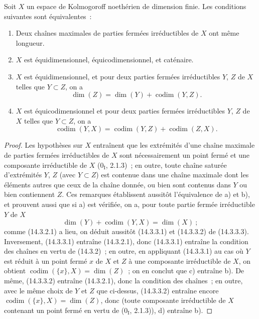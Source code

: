 \begin{proposition}[14.3.3]
\label{0.14.3.3-fr}
Soit $X$ un espace de Kolmogoroff noethérien de dimension finie. Les
conditions suivantes sont équivalentes~:
\begin{enumerate}
  \item[\rm(a)] Deux chaînes maximales de parties fermées irréductibles de $X$
  ont même longueur.
  \item[\rm(b)] $X$ est équidimensionnel, équicodimensionnel, et caténaire.
  \item[\rm(c)] $X$ est équidimensionnel, et pour deux parties fermées
  irréductibles $Y$, $Z$ de $X$ telles que $Y\subset Z$, on a
  \[
    \dim(Z)=\dim(Y)+\operatorname{codim}(Y,Z).
    \tag{14.3.3.1}\label{0.14.3.3.1-fr}
  \]
  \item[\rm(d)] $X$ est équicodimensionnel et pour deux parties fermées
  irréductibles $Y$, $Z$ de $X$ telles que $Y\subset Z$, on a
  \[
    \operatorname{codim}(Y,X)=
    \operatorname{codim}(Y,Z)+\operatorname{codim}(Z,X).
    \tag{14.3.3.2}\label{0.14.3.3.2-fr}
  \]
\end{enumerate}
\end{proposition}

\begin{proof}
Les hypothèses sur $X$ entraînent que les extrémités d'une chaîne maximale de
parties fermées irréductibles de $X$ sont nécessairement un point fermé et
une composante irréductible de $X$ ($0_{\mathrm I}$, 2.1.3)~; en outre, toute
chaîne saturée d'extrémités $Y$, $Z$ (avec $Y\subset Z$) est contenue dans une
chaîne maximale dont les éléments autres que ceux de la chaîne donnée, ou
bien sont contenus dans $Y$ ou bien contiennent $Z$. Ces remarques
établissent aussitôt l'équivalence de a) et b), et prouvent aussi que si a)
est vérifiée, on a, pour toute partie fermée irréductible $Y$ de $X$
\[
  \dim(Y)+\operatorname{codim}(Y,X)=\dim(X)~;
  \tag{14.3.3.3}\label{0.14.3.3.3-fr}
\]
comme (14.3.2.1) a lieu, on déduit aussitôt (14.3.3.1) et (14.3.3.2) de
(14.3.3.3). Inversement, (14.3.3.1) entraîne (14.3.2.1), donc (14.3.3.1)
entraîne la condition des chaînes en vertu de (14.3.2)~; en outre, en
appliquant (14.3.3.1) au cas où $Y$ est réduit à un point fermé $x$ de $X$ et
$Z$ à une composante irréductible de $X$, on obtient
$\operatorname{codim}(\{x\},X)=\dim(Z)$~; on en conclut que c) entraîne b).
De même, (14.3.3.2) entraîne (14.3.2.1), donc la condition des chaînes~; en
outre, avec le même choix de $Y$ et $Z$ que ci-dessus, (14.3.3.2) entraîne
encore $\operatorname{codim}(\{x\},X)=\dim(Z)$, donc (toute composante
irréductible de $X$ contenant un point fermé en vertu de ($0_{\mathrm I}$,
2.1.3)), d) entraîne b).
\end{proof}


